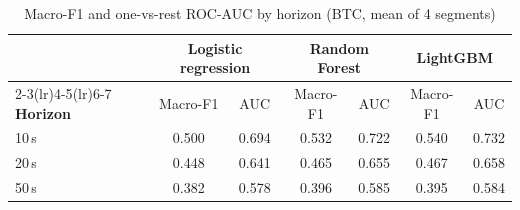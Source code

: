 \begin{table}[H]
\centering\small
\caption{Macro-F1 and one-vs-rest ROC-AUC by horizon (BTC, mean of 4 segments)}
\label{tab:btc_auc_h}
\begin{tabular}{@{}lcccccc@{}}
\toprule
 & \multicolumn{2}{c}{\textbf{Logistic regression}} & \multicolumn{2}{c}{\textbf{Random Forest}} & \multicolumn{2}{c}{\textbf{LightGBM}} \\
\cmidrule(lr){2-3}\cmidrule(lr){4-5}\cmidrule(lr){6-7}
\textbf{Horizon} & Macro-F1 & AUC & Macro-F1 & AUC & Macro-F1 & AUC \\
\midrule
10\,s & 0.500 & 0.694 & 0.532 & 0.722 & 0.540 & 0.732 \\
20\,s & 0.448 & 0.641 & 0.465 & 0.655 & 0.467 & 0.658 \\
50\,s & 0.382 & 0.578 & 0.396 & 0.585 & 0.395 & 0.584 \\
\bottomrule
\end{tabular}
\end{table}
